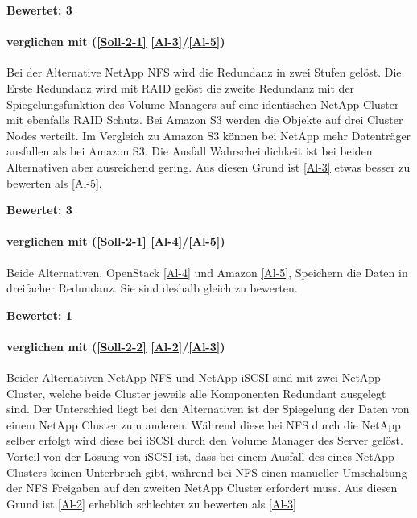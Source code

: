 \textbf{Bewertet: 3}

\paragraph*{  verglichen mit  (\ref{Soll-2-1} \ref{Al-3}/\ref{Al-5})}
Bei der Alternative NetApp NFS wird die Redundanz in zwei Stufen gelöst. Die Erste Redundanz wird mit RAID gelöst die zweite Redundanz mit der Spiegelungsfunktion des Volume Managers auf eine identischen NetApp Cluster mit ebenfalls RAID Schutz. Bei Amazon S3 werden die Objekte auf drei Cluster Nodes verteilt. Im Vergleich zu Amazon S3 können bei NetApp mehr Datenträger ausfallen als bei Amazon S3. Die Ausfall Wahrscheinlichkeit ist bei beiden Alternativen aber ausreichend gering. Aus diesen Grund ist  \ref{Al-3} etwas besser zu bewerten als  \ref{Al-5}.

\textbf{Bewertet: 3}

\paragraph*{  verglichen mit  (\ref{Soll-2-1} \ref{Al-4}/\ref{Al-5})}
Beide Alternativen, OpenStack \ref{Al-4} und Amazon \ref{Al-5}, Speichern die Daten in dreifacher Redundanz. Sie sind deshalb gleich zu bewerten.

\textbf{Bewertet: 1}




\paragraph*{  verglichen mit  (\ref{Soll-2-2} \ref{Al-2}/\ref{Al-3})}
Beider Alternativen NetApp NFS und NetApp iSCSI sind mit zwei NetApp Cluster, welche beide Cluster jeweils alle Komponenten Redundant ausgelegt sind. Der Unterschied liegt bei den Alternativen ist der Spiegelung der Daten von einem NetApp Cluster zum anderen. Während diese bei NFS durch die NetApp selber erfolgt wird diese bei iSCSI durch den Volume Manager des Server gelöst. Vorteil von der Lösung von iSCSI ist, dass bei einem Ausfall des eines NetApp Clusters keinen Unterbruch gibt, während bei NFS einen manueller Umschaltung der NFS Freigaben auf den zweiten NetApp Cluster erfordert muss. Aus diesen Grund ist  \ref{Al-2} erheblich schlechter zu bewerten als  \ref{Al-3}

